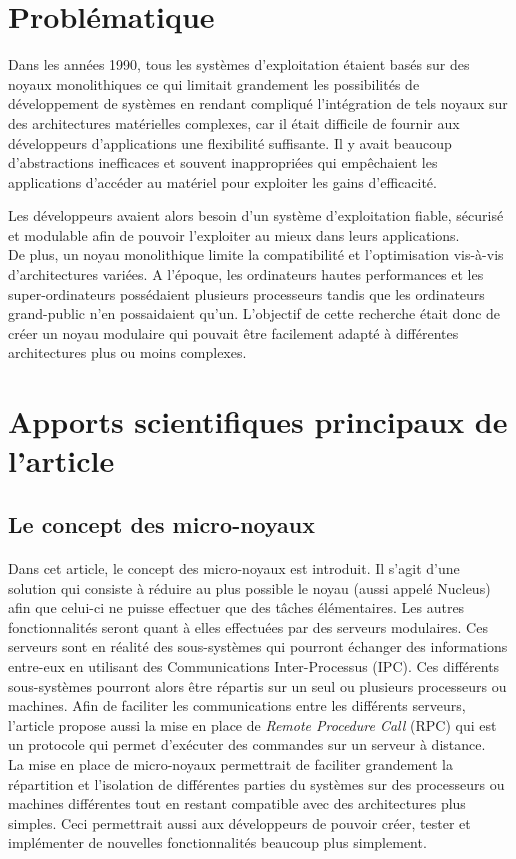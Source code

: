 \documentclass[a4paper, 12pt]{article}
\begin{document}
\clearpage 
\section{Problématique}

Dans les années 1990, tous les systèmes d'exploitation étaient basés sur des noyaux monolithiques ce qui limitait grandement les possibilités de développement de systèmes en rendant compliqué l'intégration de tels noyaux sur des architectures matérielles complexes, car il était difficile de fournir aux développeurs d'applications une flexibilité suffisante. Il y avait beaucoup d'abstractions inefficaces et souvent inappropriées qui empêchaient les applications d'accéder au matériel pour exploiter les gains d'efficacité. 

Les développeurs avaient alors besoin d'un système d'exploitation fiable, sécurisé et modulable afin de pouvoir l'exploiter au mieux dans leurs applications. \\
De plus, un noyau monolithique limite la compatibilité et l'optimisation vis-à-vis d'architectures variées. A l'époque, les ordinateurs hautes performances et les super-ordinateurs possédaient plusieurs processeurs tandis que les ordinateurs grand-public n'en possaidaient qu'un. L'objectif de cette recherche était donc de créer un noyau modulaire qui pouvait être facilement adapté à différentes architectures plus ou moins complexes.

\clearpage 
\section{Apports scientifiques principaux de l’article}
\subsection{Le concept des micro-noyaux}
\paragraph{}

Dans cet article, le concept des micro-noyaux est introduit. Il s'agit d'une solution qui consiste à réduire au plus possible le noyau (aussi appelé Nucleus) afin que celui-ci ne puisse effectuer que des tâches élémentaires. Les autres fonctionnalités seront quant à elles effectuées par des serveurs modulaires. Ces serveurs sont en réalité des sous-systèmes qui pourront échanger des informations entre-eux en utilisant des Communications Inter-Processus (IPC). Ces différents sous-systèmes pourront alors être répartis sur un seul ou plusieurs processeurs ou machines. Afin de faciliter les communications entre les différents serveurs, l'article propose aussi la mise en place de \emph{Remote Procedure Call} (RPC) qui est un protocole qui permet d'exécuter des commandes sur un serveur à distance. \\
La mise en place de micro-noyaux permettrait de faciliter grandement la répartition et l'isolation de différentes parties du systèmes sur des processeurs ou machines différentes tout en restant compatible avec des architectures plus simples. Ceci permettrait aussi aux développeurs de pouvoir créer, tester et implémenter de nouvelles fonctionnalités beaucoup plus simplement.
\end{document}
